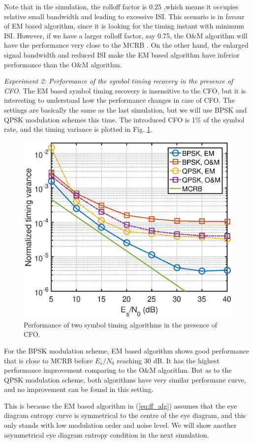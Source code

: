 \documentclass[journal,comsoc]{IEEEtran}
\begin{document}
Note that in the simulation, the rolloff factor is 0.25 ,which means it occupies relative small bandwidth and leading to excessive ISI.
This scenario is in favour of EM based algorithm, since it is looking for the timing instant with minimum ISI.
However, if we have a larger rolloff factor, say 0.75, the O\&M algorithm will have the performance very close to the MCRB \cite{mengali1997synchronization}.
On the other hand, the enlarged signal bandwidth and reduced ISI make the EM based algorithm have inferior performance than the O\&M algorithm.

\textit{Experiment 2:
Performance of the symbol timing recovery in the presence of CFO.}
The EM based symbol timing recovery is insensitive to the CFO, but it is interesting to understand how the performance changes in case of CFO. 
The settings are basically the same as the last simulation, but we will use BPSK and QPSK modulation schemes this time.
The introduced CFO is 1\% of the symbol rate, and the timing variance is plotted in Fig. \ref{fig:timing_frq_per}.

\begin{figure}[ht]
\centering
\includegraphics[width=3 in]{pic/per_timing_frq.eps}
\caption{Performance of two symbol timing algorithms in the presence of CFO.}
\label{fig:timing_frq_per} 
\end{figure}  

For the BPSK modulation scheme, EM based algorithm shows good performance that is close to MCRB before \(E_s/N_0\) reaching 30 dB.
It has the highest performance improvement comparing to the O\&M algorithm.
But as to the QPSK modulation scheme, both algorithms have very similar performane curve, and no improvement can be found in this setting.

This is because the EM based algorithm in (\ref{eq:ff_alg}) assumes that the eye diagram entropy curve is symmetrical to the centre of the eye diagram, and this only stands with low modulation order and noise level.
We will show another asymmetrical eye diagram entropy condition in the next simulation. 
\end{document}
